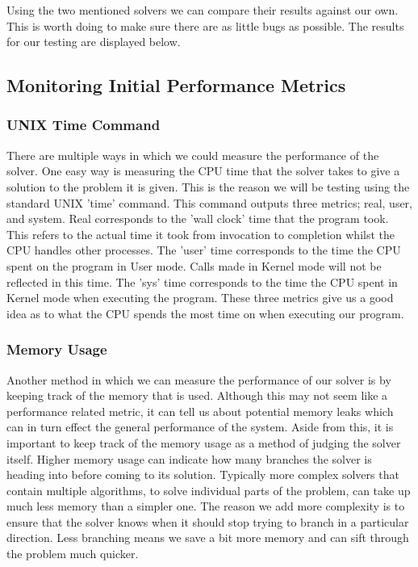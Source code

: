 \documentclass{article}
\begin{document}
Using the two mentioned solvers we can compare their results against our own. This is worth doing to make sure there are as little bugs as possible. The results for our testing are displayed below.


\subsection{Monitoring Initial Performance Metrics}

\subsubsection{UNIX Time Command}
There are multiple ways in which we could measure the performance of the solver. One easy way is
measuring the CPU time that the solver takes to give a solution to the problem it is given. This is
the reason we will be testing using the standard UNIX 'time' command. This command outputs three
metrics; real, user, and system. Real corresponds to the 'wall clock' time that the program took.
This refers to the actual time it took from invocation to completion whilst the CPU handles other
processes. The 'user' time corresponds to the time the CPU spent on the program in User mode. Calls
made in Kernel mode will not be reflected in this time. The 'sys' time corresponds to the time the
CPU spent in Kernel mode when executing the program. These three metrics give us a good idea as to
what the CPU spends the most time on when executing our program.

\subsubsection{Memory Usage}
Another method in which we can measure the performance of our solver is by keeping track of the
memory that is used. Although this may not seem like a performance related metric, it can tell us
about potential memory leaks which can in turn effect the general performance of the system. Aside
from this, it is important to keep track of the memory usage as a method of judging the solver
itself. Higher memory usage can indicate how many branches the solver is heading into before coming
to its solution. Typically more complex solvers that contain multiple algorithms, to solve
individual parts of the problem, can take up much less memory than a simpler one. The reason we add
more complexity is to ensure that the solver knows when it should stop trying to branch in a
particular direction. Less branching means we save a bit more memory and can sift through the
problem much quicker.
\end{document}
